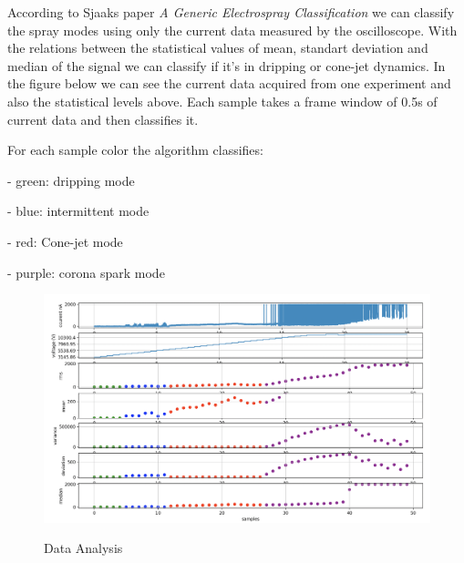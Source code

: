 According to Sjaaks paper \emph{A Generic Electrospray Classification}\cite*{Sjaaks} we can classify the spray modes using
only the current data measured by the oscilloscope. With the relations between the statistical values of mean, standart deviation and median of the signal
we can classify if it's in dripping or cone-jet dynamics. In the figure below we can see the current data acquired from one experiment and also the statistical levels
above. Each sample takes a frame window of 0.5s of current data and then classifies it.

For each sample color the algorithm classifies:

  - green: dripping mode

  - blue: intermittent mode

  - red: Cone-jet mode

  - purple: corona spark mode


\begin{figure}[H]
    \center
    \includegraphics[width=12cm]{images/exp_data.png}
    \label{img2}
    \caption{Data Analysis}
\end{figure}


